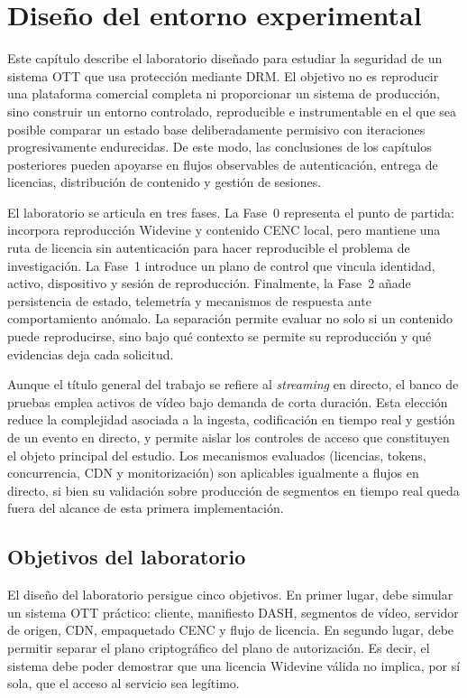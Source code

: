 
\chapter{Diseño del entorno experimental}

Este capítulo describe el laboratorio diseñado para estudiar la seguridad de un sistema OTT que usa protección mediante DRM. El objetivo no es reproducir una plataforma comercial completa ni proporcionar un sistema de producción, sino construir un entorno controlado, reproducible e instrumentable en el que sea posible comparar un estado base deliberadamente permisivo con iteraciones progresivamente endurecidas. De este modo, las conclusiones de los capítulos posteriores pueden apoyarse en flujos observables de autenticación, entrega de licencias, distribución de contenido y gestión de sesiones.

El laboratorio se articula en tres fases. La Fase~0 representa el punto de partida: incorpora reproducción Widevine y contenido CENC local, pero mantiene una ruta de licencia sin autenticación para hacer reproducible el problema de investigación. La Fase~1 introduce un plano de control que vincula identidad, activo, dispositivo y sesión de reproducción. Finalmente, la Fase~2 añade persistencia de estado, telemetría y mecanismos de respuesta ante comportamiento anómalo. La separación permite evaluar no solo si un contenido puede reproducirse, sino bajo qué contexto se permite su reproducción y qué evidencias deja cada solicitud.

Aunque el título general del trabajo se refiere al \textit{streaming} en directo, el banco de pruebas emplea activos de vídeo bajo demanda de corta duración. Esta elección reduce la complejidad asociada a la ingesta, codificación en tiempo real y gestión de un evento en directo, y permite aislar los controles de acceso que constituyen el objeto principal del estudio. Los mecanismos evaluados (licencias, tokens, concurrencia, CDN y monitorización) son aplicables igualmente a flujos en directo, si bien su validación sobre producción de segmentos en tiempo real queda fuera del alcance de esta primera implementación.

\section{Objetivos del laboratorio}

El diseño del laboratorio persigue cinco objetivos. En primer lugar, debe simular un sistema OTT práctico: cliente, manifiesto DASH, segmentos de vídeo, servidor de origen, CDN, empaquetado CENC y flujo de licencia. En segundo lugar, debe permitir separar el plano criptográfico del plano de autorización. Es decir, el sistema debe poder demostrar que una licencia Widevine válida no implica, por sí sola, que el acceso al servicio sea legítimo.

